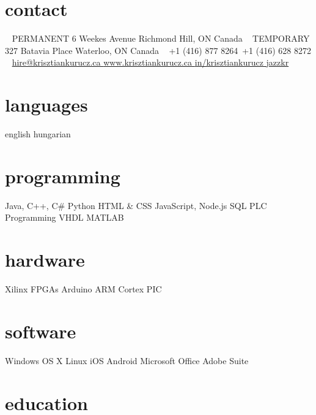 \documentclass[hidelinks]{kkurucz-cv}
\begin{document}


\begin{aside} %
\section{contact}
~
{\headingfont PERMANENT}
6 Weekes Avenue
Richmond Hill, ON
Canada
~
{\headingfont TEMPORARY}
327 Batavia Place
Waterloo, ON
Canada
~
{+1 (416) 877 8264\hspace{1.5mm}\mobile}\,
{+1 (416) 628 8272 \phone}
~
\href{mailto:hire@krisztiankurucz.ca}{hire@krisztiankurucz.ca }\mail
\href{http://www.krisztiankurucz.ca}{www.krisztiankurucz.ca }\website
\href{http://ca.linkedin.com/in/krisztiankurucz}{in/krisztiankurucz }\linkedin
\href{http://www.github.com/jazzkr}{jazzkr }\github
\section{languages}
english 
hungarian
\section{programming}
Java, C++, C\#
Python
HTML \& CSS
JavaScript, Node.js
SQL
PLC Programming
VHDL
MATLAB
\section{hardware}
Xilinx FPGAs
Arduino
ARM Cortex
PIC
\section{software}
Windows
OS X
Linux
iOS
Android
Microsoft Office
Adobe Suite
\end{aside}


\section{education}
\end{document}
